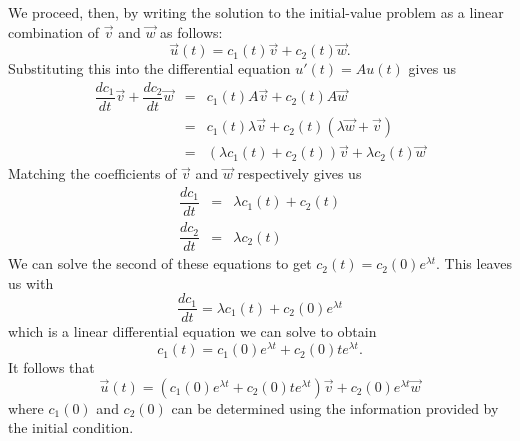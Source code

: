 \documentclass[../book.tex]{subfiles}
\begin{document}
We proceed, then, by writing the solution to the initial-value problem as a linear combination of \(\vec{v}\) and \(\vec{w}\) as follows:
\begin{equation}\label{eq:sys-32}
\vec{u}(t) = c_1(t)  \vec{v} + c_2(t) \vec{w}.
\end{equation}
Substituting this into the differential equation \(u'(t) = A u(t)\) gives us
\begin{equation}\label{eq:sys-33}
\begin{array}{lcl}
  \dfrac{dc_1}{dt} \vec{v}
  +
  \dfrac{dc_2}{dt} \vec{w}
      &=&
      c_1(t)  A \vec{v} + c_2(t) A \vec{w}
      \\[1ex]
      &=&
      c_1(t)  \lambda \vec{v}
      +
      c_2(t)  (\lambda \vec{w} + \vec{v})
      \\[1ex]
      &=&
      (\lambda c_1(t) + c_2(t) ) \vec{v}
      +
      \lambda c_2(t)  \vec{w} 
\end{array}
\end{equation}
Matching the coefficients of \(\vec{v}\) and \(\vec{w}\) respectively gives us
\begin{equation}\label{eq:sys-34}
\begin{array}{lcl}
  \dfrac{dc_1}{dt}
              &=&
              \lambda c_1(t) + c_2(t) \\[2ex]
              \dfrac{dc_2}{dt}
              &=&
              \lambda c_2(t)
\end{array}
\end{equation}
We can solve the second of these equations to get \(c_2(t) = c_2(0)  e^{\lambda t}\). This leaves us with
\begin{equation}\label{eq:sys-35}
\dfrac{dc_1}{dt} = \lambda c_1(t) + c_2(0) e^{\lambda t}
\end{equation}
which is a linear differential equation we can solve to obtain
\begin{equation}\label{eq:sys-36}
c_1(t)  = c_1(0) e^{\lambda t} + c_2(0)  t e^{\lambda t}.
\end{equation}
It follows that
\begin{equation}\label{eq:repeat}
  \vec{u}(t)
  =
  \left(
    c_1(0) e^{\lambda t} + c_2(0)  t e^{\lambda t}
  \right) \vec{v}
  +
  c_2(0)  e^{\lambda t}  \vec{w}
\end{equation}
where \(c_1(0)\) and \(c_2(0)\) can be determined using the information provided by the initial condition.
\end{document}

